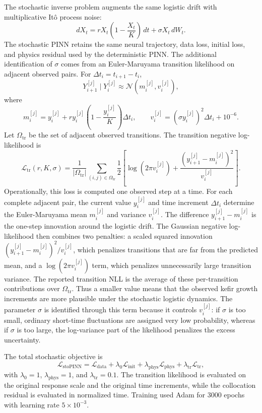 The stochastic inverse problem augments the same logistic drift with
multiplicative It\^o process noise:
$$
  dX_t
  =
  rX_t\left(1-\frac{X_t}{K}\right)\,dt
  +
  \sigma X_t\,dW_t .
$$
The stochastic PINN retains the same neural trajectory, data loss, initial
loss, and physics residual used by the deterministic PINN. The additional
identification of $\sigma$ comes from an Euler-Maruyama transition likelihood
on adjacent observed pairs. For $\Delta t_i=t_{i+1}-t_i$,
$$
  Y_{i+1}^{[j]}\mid Y_i^{[j]}
  \approx
  \mathcal N(m_i^{[j]},v_i^{[j]}),
$$
where
$$
  m_i^{[j]}
  =
  y_i^{[j]}
  +
  r y_i^{[j]}\left(1-\frac{y_i^{[j]}}{K}\right)\Delta t_i,
  \qquad
  v_i^{[j]}
  =
  \left(\sigma y_i^{[j]}\right)^2\Delta t_i+10^{-6}.
$$
Let $\Omega_{\mathrm{tr}}$ be the set of adjacent observed transitions. The
transition negative log-likelihood is
$$
  \mathcal L_{\mathrm{tr}}(r,K,\sigma)
  =
  \frac{1}{|\Omega_{\mathrm{tr}}|}
  \sum_{(i,j)\in\Omega_{\mathrm{tr}}}
  \frac{1}{2}
  \left[
    \log(2\pi v_i^{[j]})
    +
    \frac{(y_{i+1}^{[j]}-m_i^{[j]})^2}{v_i^{[j]}}
  \right].
$$
Operationally, this loss is computed one observed step at a time. For each
complete adjacent pair, the current value $y_i^{[j]}$ and time increment
$\Delta t_i$ determine the Euler-Maruyama mean $m_i^{[j]}$ and variance
$v_i^{[j]}$. The difference $y_{i+1}^{[j]}-m_i^{[j]}$ is the one-step
innovation around the logistic drift. The Gaussian negative log-likelihood
then combines two penalties: a scaled squared innovation
$(y_{i+1}^{[j]}-m_i^{[j]})^2/v_i^{[j]}$, which penalizes transitions that are
far from the predicted mean, and a $\log(2\pi v_i^{[j]})$ term, which penalizes
unnecessarily large transition variance. The reported transition NLL is the
average of these per-transition contributions over $\Omega_{\mathrm{tr}}$.
Thus a smaller value means that the observed kefir growth increments are more
plausible under the stochastic logistic dynamics. The parameter $\sigma$ is
identified through this term because it controls $v_i^{[j]}$: if $\sigma$ is
too small, ordinary short-time fluctuations are assigned very low probability,
whereas if $\sigma$ is too large, the log-variance part of the likelihood
penalizes the excess uncertainty.

The total stochastic objective is
$$
  \mathcal L_{\mathrm{stoPINN}}
  =
  \mathcal L_{\mathrm{data}}
  +
  \lambda_0\mathcal L_{\mathrm{init}}
  +
  \lambda_{\mathrm{phys}}\mathcal L_{\mathrm{phys}}
  +
  \lambda_{\mathrm{tr}}\mathcal L_{\mathrm{tr}},
$$
with $\lambda_0=1$, $\lambda_{\mathrm{phys}}=1$, and
$\lambda_{\mathrm{tr}}=0.1$. The transition likelihood is evaluated on the
original response scale and the original time increments, while the
collocation residual is evaluated in normalized time. Training used Adam for
3000 epochs with learning rate $5\times10^{-3}$.

